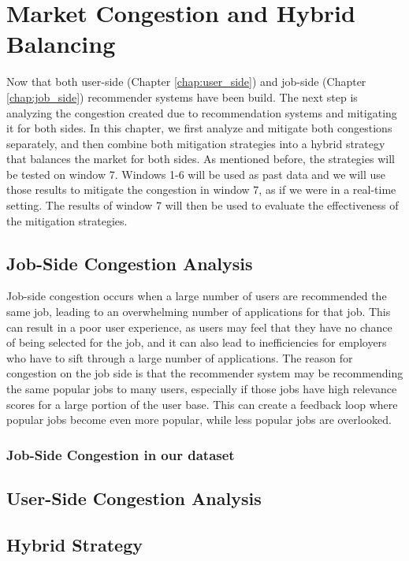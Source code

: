 \chapter{Market Congestion and Hybrid Balancing}
\label{chap:congestion_balancing}
Now that both user-side (Chapter \ref{chap:user_side}) and job-side (Chapter \ref{chap:job_side}) recommender systems have been build. The next step is analyzing the congestion created due to recommendation systems and mitigating it for both sides. In this chapter, we first analyze and mitigate both congestions separately, and then combine both mitigation strategies into a hybrid strategy that balances the market for both sides.
As mentioned before, the strategies will be tested on window 7. Windows 1-6 will be used as past data and we will use those results to mitigate the congestion in window 7, as if we were in a real-time setting. The results of window 7 will then be used to evaluate the effectiveness of the mitigation strategies.
\section{Job-Side Congestion Analysis}
\label{sec:job_congestion}
Job-side congestion occurs when a large number of users are recommended the same job, leading to an overwhelming number of applications for that job. This can result in a poor user experience, as users may feel that they have no chance of being selected for the job, and it can also lead to inefficiencies for employers who have to sift through a large number of applications. The reason for congestion on the job side is that the recommender system may be recommending the same popular jobs to many users, especially if those jobs have high relevance scores for a large portion of the user base. This can create a feedback loop where popular jobs become even more popular, while less popular jobs are overlooked.

\subsection{Job-Side Congestion in our dataset}
\label{sec:job_congestion_dataset}

\section{User-Side Congestion Analysis}
\label{sec:user_congestion}

\section{Hybrid Strategy}
\label{sec:hybrid_strategy}

